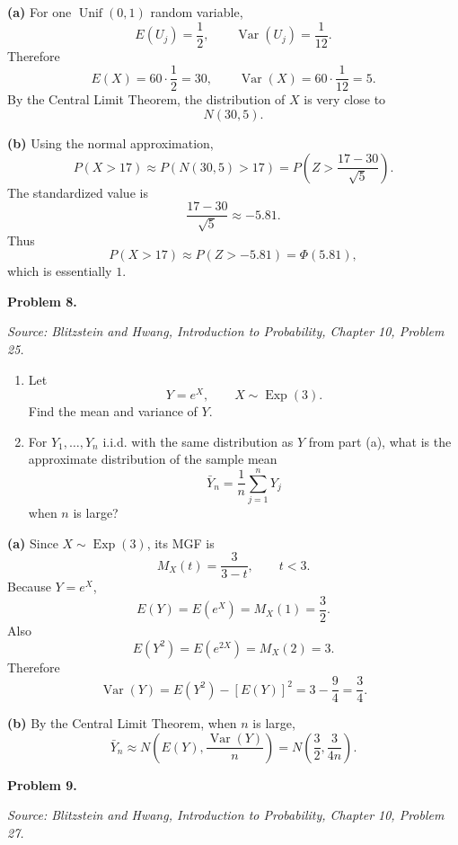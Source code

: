 \documentclass[11pt]{article}
\newcommand{\Var}{\operatorname{Var}}
\newcommand{\source}[2]{%
    \vspace{0.15cm}
    {\small\textit{Source: Blitzstein and Hwang, \textit{Introduction to Probability}, Chapter #1, Problem #2.}}
}
\begin{document}
\begin{solutionbox}
\textbf{(a)} For one $\operatorname{Unif}(0,1)$ random variable,
\[
E(U_j)=\frac12,
\qquad
\Var(U_j)=\frac1{12}.
\]
Therefore
\[
E(X)=60\cdot\frac12=30,
\qquad
\Var(X)=60\cdot\frac1{12}=5.
\]
By the Central Limit Theorem, the distribution of $X$ is very close to
\[
N(30,5).
\]
 

\textbf{(b)} Using the normal approximation,
\[
P(X>17)
\approx
P\left(N(30,5)>17\right)
=
P\left(Z>\frac{17-30}{\sqrt5}\right).
\]
The standardized value is
\[
\frac{17-30}{\sqrt5}\approx -5.81.
\]
Thus
\[
P(X>17)\approx P(Z>-5.81)=\Phi(5.81),
\]
which is essentially $1$.
 
\end{solutionbox}
\newpage


\begin{problemheader}
\textbf{Problem 8.}
\end{problemheader}
\source{10}{25}

\begin{enumerate}[label=(\alph*), leftmargin=*]
    \item Let
    \[
    Y=e^X,
    \qquad
    X\sim \operatorname{Exp}(3).
    \]
    Find the mean and variance of $Y$.

    \item For $Y_1,\dots,Y_n$ i.i.d. with the same distribution as $Y$ from part (a), what is the approximate distribution of the sample mean
    \[
    \bar Y_n=\frac1n\sum_{j=1}^{n}Y_j
    \]
    when $n$ is large?
\end{enumerate}

\begin{solutionbox}
\textbf{(a)} Since $X\sim\operatorname{Exp}(3)$, its MGF is
\[
M_X(t)=\frac{3}{3-t},
\qquad t<3.
\]
Because $Y=e^X$,
\[
E(Y)=E(e^X)=M_X(1)=\frac32.
\]
Also
\[
E(Y^2)=E(e^{2X})=M_X(2)=3.
\]
Therefore
\[
\Var(Y)=E(Y^2)-[E(Y)]^2
=3-\frac94
=\frac34.
\]
 

\textbf{(b)} By the Central Limit Theorem, when $n$ is large,
\[
\bar Y_n\approx N\left(E(Y),\frac{\Var(Y)}{n}\right)
=
N\left(\frac32,\frac{3}{4n}\right).
\]
 
\end{solutionbox}
\newpage


\begin{problemheader}
\textbf{Problem 9. }
\end{problemheader}
\source{10}{27}
\end{document}
